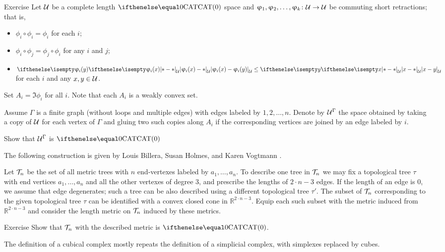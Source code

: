 \begin{thm}{Exercise}\label{ex:short+commuting}
Let $\mathcal{U}$ be a complete length $\CAT0$ space
and $\phi_1,\phi_2,\dots,\phi_k\:\spc{U}\to \spc{U}$ be commuting short retractions; 
that is, 
\begin{itemize}
\item $\phi_i\circ\phi_i=\phi_i$ for each $i$;
\item $\phi_i\circ\phi_j=\phi_j\circ\phi_i$ for any $i$ and $j$;
\item $\dist{\phi_i(x)}{\phi_i(y)}{\spc{U}}\le \dist{x}{y}{\spc{U}}$ for each $i$ and any $x,y\in\spc{U}$.
\end{itemize}
Set $A_i=\Im \phi_i$ for all $i$.
Note that each $A_i$ is a weakly convex set.

Assume $\Gamma$ is a finite graph 
(without loops and multiple edges) 
with edges labeled by $1,2,\dots, n$.
Denote by $\mathcal{U}^\Gamma$ the space obtained by taking 
a copy of $\mathcal{U}$ for each vertex of $\Gamma$ and 
gluing two such copies along $A_i$ if the corresponding vertices are joined by an edge labeled by $i$.

Show that $\mathcal{U}^\Gamma$ is $\CAT0$
\end{thm}

The following construction is given by 
Louis Billera,
Susan Holmes,
and  Karen Vogtmann \cite{billera-holmes-vogtmann}.

Let $\mathcal{T}_n$ be the set of all metric trees with $n$ end-vertexes
labeled by $a_1,\dots,a_n$.
To describe one tree in $\mathcal{T}_n$ we may fix a topological tree $\tau$ with end vertices $a_1,\dots,a_n$ and all the other vertexes of degree 3,  
and prescribe the lengths of $2\cdot n-3$ edges.
If the length of an edge is $0$, we assume that edge degenerates;
such a tree can be also described using a different topological tree $\tau'$.
The subset of $\mathcal{T}_n$ corresponding to the given topological tree $\tau$ can be identified with a convex closed cone in  $\mathbb{R}^{2\cdot n-3}$.
Equip each such subset with the metric induced from $\mathbb{R}^{2\cdot n-3}$ and consider the length metric on $\mathcal{T}_n$ induced by these metrics.

\begin{thm}{Exercise}\label{ex:space-of-trees}
Show that $\mathcal{T}_n$ with the described metric is $\CAT0$.
\end{thm}



The definition of a cubical complex
mostly repeats the definition of a simplicial complex, 
with simplexes replaced by cubes.

